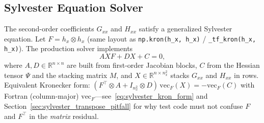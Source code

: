\documentclass[11pt,a4paper]{article}
\theoremstyle{definition}
\newcommand{\code}[1]{\texttt{\color{codecolor}#1}}
\begin{document}
	\subsection{Sylvester Equation Solver}
	\label{sec:sylvester_solver}

	The second-order coefficients $G_{xx}$ and $H_{xx}$ satisfy a generalized Sylvester equation.
	Let $F = h_x \otimes h_x$ (same layout as \code{np.kron(h\_x, h\_x)} / \code{\_tf\_kron(h\_x, h\_x)}).
	The production solver implements
	\begin{equation}\label{eq:sylvester_raw}
		A X F + D X + C = 0,
	\end{equation}
	where $A, D \in \mathbb{R}^{n \times n}$ are built from first-order Jacobian blocks, $C$ from the Hessian tensor $\Psi$ and the stacking matrix $M$, and $X \in \mathbb{R}^{n \times n_x^2}$ stacks $G_{xx}$ and $H_{xx}$ in rows.
	Equivalent Kronecker form: $(F^\top \otimes A + I_{n_x^2} \otimes D)\,\mathrm{vec}_F(X) = -\mathrm{vec}_F(C)$ with Fortran (column-major) $\mathrm{vec}_F$---see~\eqref{eq:sylvester_kron_form} and Section~\ref{sec:sylvester_transpose_pitfall} for why test code must not confuse $F$ and $F^\top$ in the \emph{matrix} residual.
\end{document}
